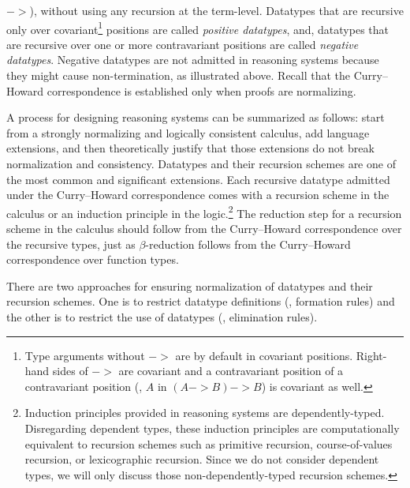 $->$), without using any recursion at the term-level.
Datatypes that are recursive only over covariant\footnote{Type arguments
        without $->$ are by default in covariant positions. Right-hand sides
        of $->$ are covariant and a contravariant position of
        a contravariant position (\eg, $A$ in $(A -> B) -> B$) is
        covariant as well.}
positions are called \emph{positive datatypes}, and, datatypes that
are recursive over one or more contravariant positions are called
\emph{negative datatypes}. Negative datatypes are not admitted
in reasoning systems because they might cause non-termination,
as illustrated above. Recall that the Curry--Howard correspondence
is established only when proofs are normalizing.

A process for designing reasoning systems can be summarized as follows: 
start from a strongly normalizing and logically consistent calculus,
add language extensions, and then theoretically justify that those extensions
do not break normalization and consistency. Datatypes and their recursion
schemes are one of the most common and significant extensions.
Each recursive datatype admitted under the Curry--Howard correspondence
comes with a recursion scheme in the calculus or an induction principle
in the logic.\footnote{
        Induction principles provided in reasoning systems are
        dependently-typed. Disregarding dependent types, these
        induction principles are computationally equivalent to
        recursion schemes such as primitive recursion,
        course-of-values recursion, or lexicographic recursion.
        Since we do not consider dependent types, we will only discuss
        those non-dependently-typed recursion schemes.}
The reduction step for a recursion scheme in the calculus should follow
from the Curry--Howard correspondence over the recursive types, just as
$\beta$-reduction follows from the Curry--Howard correspondence
over function types.

There are two approaches for ensuring normalization of datatypes and
their recursion schemes. One is to restrict datatype definitions
(\ie, formation rules) and the other is to restrict the use of datatypes
(\ie, elimination rules).

